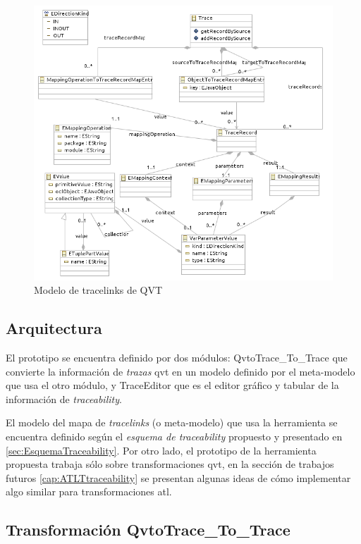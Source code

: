 \documentclass[a4paper,12pt,oneside,spanish]{book}
\begin{document}
\begin{figure}[hbtp]
\centering
\includegraphics[scale=0.78]{./img/QVTTraceModel}
\caption{Modelo de tracelinks de QVT}
\label{fig:QVTTraceModel}
\end{figure}



\subsection{Arquitectura}


El prototipo se encuentra definido por dos módulos: \textsf{QvtoTrace\_To\_Trace} que convierte la información de \textit{trazas} \gls{qvt} en un modelo definido por el meta-modelo que usa el otro módulo, y \textsf{TraceEditor} que es el editor gráfico y tabular de la información de \textit{traceability}.

El modelo del mapa de \textit{tracelinks} (o meta-modelo) que usa la herramienta se encuentra definido según el \textit{esquema de traceability} propuesto y presentado en \ref{sec:EsquemaTraceability}. Por otro lado, el prototipo de la herramienta propuesta trabaja sólo sobre transformaciones \gls{qvt}, en la sección de trabajos futuros \ref{cap:ATLTtraceability} se presentan algunas ideas de cómo implementar algo similar para transformaciones \gls{atl}.



\subsection{Transformación QvtoTrace{\_}To{\_}Trace}
\end{document}
